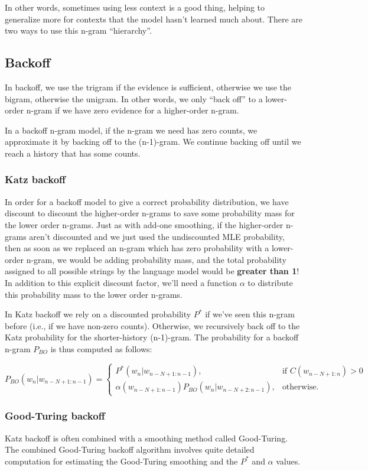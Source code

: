 In other words, sometimes using less context is a good thing, helping to generalize more for contexts that the model hasn’t learned much about. There are two ways to use this n-gram “hierarchy”.

\subsection{Backoff}
In backoff, we use the trigram if the evidence is sufficient, otherwise we use the bigram, otherwise the unigram. In other words, we only “back off” to a lower-order n-gram if we have zero evidence for a higher-order n-gram. 

In a backoff n-gram model, if the n-gram we need has zero counts, we approximate it by backing off to the (n-1)-gram. We continue backing off until we reach a history that has some counts.

\subsubsection{Katz backoff}

In order for a backoff model to give a correct probability distribution, we have discount to discount the higher-order n-grams to save some probability mass for the lower order n-grams. Just as with add-one smoothing, if the higher-order n-grams aren’t discounted and we just used the undiscounted MLE probability, then as soon as we replaced an n-gram which has zero probability with a lower-order n-gram, we would be adding probability mass, and the total probability assigned to all possible strings by the language model would be \textbf{greater than 1}! In addition to this explicit discount factor, we’ll need a function $\alpha$ to distribute this probability mass to the lower order n-grams.

In Katz backoff we rely on a discounted probability $P^*$
if we’ve seen this n-gram before (i.e., if we have non-zero counts). Otherwise, we recursively back off to the Katz probability for the shorter-history (n-1)-gram. The probability for a backoff n-gram $P_{BO}$ is thus computed as follows:

\[
    P_{BO}(w_n|w_{n-N+1:n-1}) =
\begin{cases} 
    P^*(w_n|w_{n-N+1:n-1}), & \text{if } C(w_{n-N+1:n}) > 0 \\
    \alpha(w_{n-N+1:n-1}) P_{BO}(w_n|w_{n-N+2:n-1}), & \text{otherwise}.
\end{cases}
\]

\subsubsection{Good-Turing backoff}
Katz backoff is often combined with a smoothing method called Good-Turing. The combined Good-Turing backoff algorithm involves quite detailed computation for estimating the Good-Turing smoothing and the $P^*$ and $\alpha$ values.

